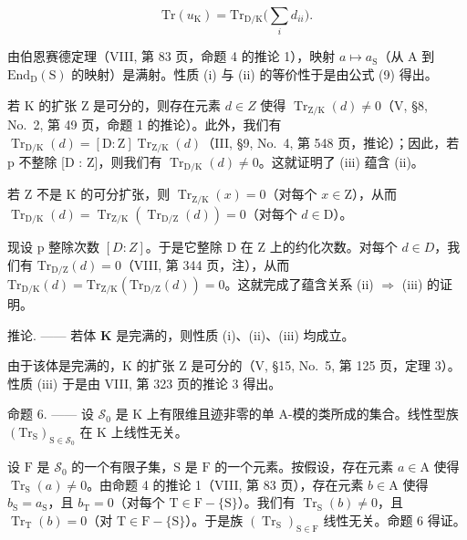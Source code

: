 \[
\mathrm{Tr} (u _ {\mathrm{K}}) = \mathrm{Tr} _ {\mathrm{D/K}} \bigl (\sum_ {i} d _ {i i} \bigr).\tag{9}
\]

由伯恩赛德定理（VIII, 第 83 页，命题 4 的推论 1），映射 \(a \mapsto a_{\mathrm{S}}\)（从 A 到 \(\mathrm{End}_{\mathrm{D}}(\mathrm{S})\) 的映射）是满射。性质 (i) 与 (ii) 的等价性于是由公式 (9) 得出。

若 K 的扩张 Z 是可分的，则存在元素 \(d \in Z\) 使得 \(\operatorname{Tr}_{\mathrm{Z/K}}(d) \neq 0\)（V, §8, No.~2, 第 49 页，命题 1 的推论）。此外，我们有 \(\operatorname{Tr}_{\mathrm{D/K}}(d) = [\mathrm{D} : \mathrm{Z}] \operatorname{Tr}_{\mathrm{Z/K}}(d)\)（III, §9, No.~4, 第 548 页，推论）；因此，若 p 不整除 {[}D : Z{]}，则我们有 \(\operatorname{Tr}_{\mathrm{D/K}}(d) \neq 0\)。这就证明了 (iii) 蕴含 (ii)。

若 \(\mathrm{Z}\) 不是 \(\mathrm{K}\) 的可分扩张，则 \(\operatorname{Tr}_{\mathrm{Z / K}}(x) = 0\)（对每个 \(x \in \mathrm{Z}\)），从而 \(\operatorname{Tr}_{\mathrm{D / K}}(d) = \operatorname{Tr}_{\mathrm{Z / K}}(\operatorname{Tr}_{\mathrm{D / Z}}(d)) = 0\)（对每个 \(d \in \mathrm{D}\)）。

现设 p 整除次数 \([D:Z]\)。于是它整除 D 在 Z 上的约化次数。对每个 \(d \in D\)，我们有 \(\mathrm{Tr}_{\mathrm{D}/\mathrm{Z}}(d) = 0\)（VIII, 第 344 页，注），从而 \(\mathrm{Tr}_{\mathrm{D}/\mathrm{K}}(d) = \mathrm{Tr}_{\mathrm{Z}/\mathrm{K}}(\mathrm{Tr}_{\mathrm{D}/\mathrm{Z}}(d)) = 0\)。这就完成了蕴含关系 (ii) \(\Rightarrow\) (iii) 的证明。

推论. —— 若体 \(\mathbf{K}\) 是完满的，则性质 (i)、(ii)、(iii) 均成立。

由于该体是完满的，K 的扩张 Z 是可分的（V, §15, No.~5, 第 125 页，定理 3）。性质 (iii) 于是由 VIII, 第 323 页的推论 3 得出。

命题 6. —— 设 \(\mathcal{S}_0\) 是 K 上有限维且迹非零的单 A-模的类所成的集合。线性型族 \((\mathrm{Tr}_{\mathrm{S}})_{\mathrm{S}\in \mathcal{S}_0}\) 在 K 上线性无关。

设 \(\mathrm{F}\) 是 \(\mathcal{S}_0\) 的一个有限子集，\(\mathrm{S}\) 是 \(\mathrm{F}\) 的一个元素。按假设，存在元素 \(a \in \mathrm{A}\) 使得 \(\operatorname{Tr}_{\mathrm{S}}(a) \neq 0\)。由命题 4 的推论 1（VIII, 第 83 页），存在元素 \(b \in \mathrm{A}\) 使得 \(b_{\mathrm{S}} = a_{\mathrm{S}}\)，且 \(b_{\mathrm{T}} = 0\)（对每个 \(\mathrm{T} \in \mathrm{F} - \{\mathrm{S}\}\)）。我们有 \(\operatorname{Tr}_{\mathrm{S}}(b) \neq 0\)，且 \(\operatorname{Tr}_{\mathrm{T}}(b) = 0\)（对 \(\mathrm{T} \in \mathrm{F} - \{\mathrm{S}\}\)）。于是族 \((\operatorname{Tr}_{\mathrm{S}})_{\mathrm{S} \in \mathrm{F}}\) 线性无关。命题 6 得证。

